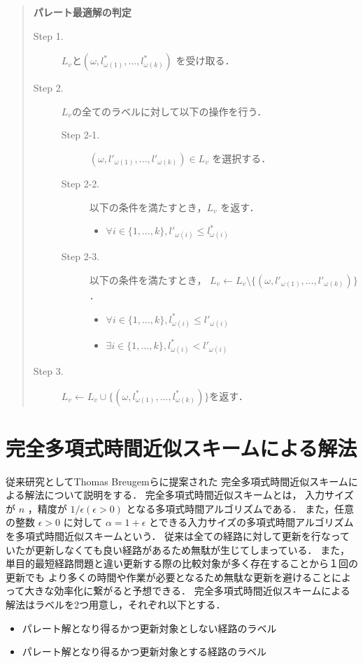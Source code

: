 \documentclass[12pt]{optlab-bachelor}
\begin{document}
\begin{quote}
  \textbf{パレート最適解の判定}
  \begin{description}
    \item[Step 1.] $L_v$と$(\omega,l^*_{\omega(1)},\ldots,l^*_{\omega(k)})$
    を受け取る．
    \item[Step 2.] $L_v$の全てのラベルに対して以下の操作を行う．
    \begin{description}
    \item[Step 2-1.] $(\omega,l'_{\omega(1)},\ldots,l'_{\omega(k)}) \in L_v$
    を選択する．
    \item[Step 2-2.] 以下の条件を満たすとき，$L_v$ を返す．
    \begin{itemize}
      \item $\forall i \in \{1,\ldots,k\},l'_{\omega(i)} \le l^*_{\omega(i)}$
    \end{itemize}
    \item[Step 2-3.] 以下の条件を満たすとき，
    $L_v \leftarrow L_v \setminus \{(\omega,l'_{\omega(1)},\ldots,l'_{\omega(k)})\}$ ．
    \begin{itemize}
      \item $\forall i \in \{1,\ldots,k\},l^*_{\omega(i)} \le l'_{\omega(i)}$
      \item $\exists i \in \{1,\ldots,k\},l^*_{\omega(i)} < l'_{\omega(i)}$
    \end{itemize}
    \end{description}
    \item[Step 3.]
    $L_v \leftarrow L_v \cup \{(\omega,l^*_{\omega(1)},\ldots,l^*_{\omega(k)})\}$を返す．
  \end{description}
\end{quote}

\section{完全多項式時間近似スキームによる解法}
従来研究としてThomas Breugemら\cite{Breugem}に提案された
完全多項式時間近似スキームによる解法について説明をする．
完全多項式時間近似スキームとは，
入力サイズが $n$ ，精度が $1 / \epsilon(\epsilon > 0)$
となる多項式時間アルゴリズムである．
また，任意の整数 $\epsilon > 0$ に対して $\alpha = 1+\epsilon$
とできる入力サイズの多項式時間アルゴリズムを多項式時間近似スキームという．
従来は全ての経路に対して更新を行なっていたが更新しなくても良い経路があるため無駄が生じてしまっている．
また，単目的最短経路問題と違い更新する際の比較対象が多く存在することから１回の更新でも
より多くの時間や作業が必要となるため無駄な更新を避けることによって大きな効率化に繋がると予想できる．
完全多項式時間近似スキームによる解法はラベルを2つ用意し，それぞれ以下とする．
\begin{itemize}
\item パレート解となり得るかつ更新対象としない経路のラベル
\item パレート解となり得るかつ更新対象とする経路のラベル
\end{itemize}
\end{document}
